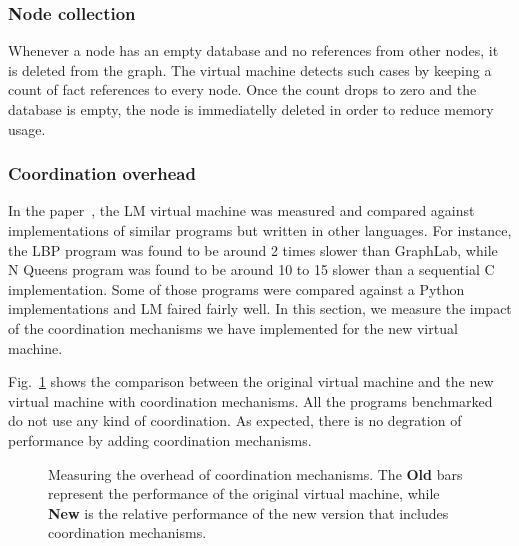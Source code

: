 \subsubsection{Node collection}

Whenever a node has an empty database and no references from other nodes, it is
deleted from the graph. The virtual machine detects such cases by keeping a
count of fact references to every node. Once the count drops to zero and the
database is empty, the node is immediatelly deleted in order to reduce memory
usage.

\subsubsection{Coordination overhead}

In the paper~\cite{cruz-ppdp14}, the LM virtual machine was measured and
compared against implementations of similar programs but written in other
languages. For instance, the LBP program was found to be around 2 times slower
than GraphLab, while N Queens program was found to be around 10 to 15 slower
than a sequential C implementation. Some of those programs were compared against
a Python implementations and LM faired fairly well. In this section, we measure
the impact of the coordination mechanisms we have implemented for the new
virtual machine.

Fig.~\ref{results:comparison1} shows the comparison between the original virtual
machine and the new virtual machine with coordination mechanisms. All the
programs benchmarked do not use any kind of coordination. As expected, there
is no degration of performance by adding coordination mechanisms.

\begin{figure}[h!]
   \begin{center}
   \end{center}
   \caption{Measuring the overhead of coordination mechanisms. The \textbf{Old}
   bars represent the performance of the original virtual machine, while
   \textbf{New} is the relative performance of the new version that includes
   coordination mechanisms.}
   \label{results:comparison1}
\end{figure}
